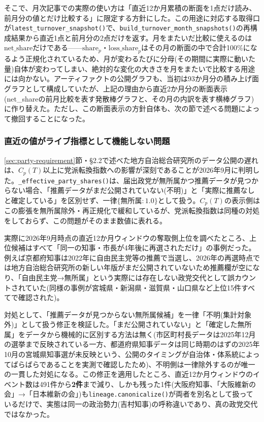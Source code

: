 \documentclass[a4paper,11pt]{ltjsarticle}
\begin{document}
そこで、月次記事での実際の使い方は「直近12か月累積の断面を1点だけ読み、前月分の値とだけ比較する」に限定する方針にした。この用途に対応する取得口が\texttt{latest\_turnover\_snapshot()}で、\texttt{build\_turnover\_month\_snapshots()}の再構成結果から直近1点と前月分の2点だけを返す。月をまたいだ比較に使えるのは$\text{net\_share}$だけである——$\text{share}_p$・$\text{loss\_share}_p$はその月の断面の中で合計100\%になるよう正規化されているため、月が変わるたびに分母(その期間に実際に動いた量)自体が変わってしまい、絶対的な変化の大きさを月をまたいで比較する用途には向かない。アーティファクトの公開グラフも、当初は93か月分の積み上げ面グラフとして構成していたが、上記の理由から直近2か月分の断面表示(net\_shareの前月比較を表す発散棒グラフと、その月の内訳を表す横棒グラフ)に作り替えた。ただし、この断面表示の方針自体も、次の節で述べる問題によって撤回することになった。

\subsubsection{直近の値がライブ指標として機能しない問題}
\label{sec:turnover-lag-problem}

\ref{sec:party-requirement}節・\S2.2で述べた地方自治総合研究所のデータ公開の遅れは、$C_p(T)$以上に党派転換指数への影響が深刻であることが2026年9月に判明した。\texttt{\_effective\_party\_shares()}は、届出政党が無所属かつ推薦データが見つからない場合、「推薦データがまだ公開されていない(不明)」と「実際に推薦なしと確定している」を区別せず、一律$\{$無所属$: 1.0\}$として扱う。$C_p(T)$の表示側はこの膨張を無所属除外・再正規化で緩和しているが、党派転換指数は同種の対処をしておらず、この問題がそのまま数値に表れる。

実際に2026年9月時点の直近12か月ウィンドウの奪取側上位を調べたところ、上位候補はすべて「同一の知事・市長が4年後に再選されただけ」の事例だった。例えば京都府知事は2022年に自由民主党等の推薦で当選し、2026年の再選時点では地方自治総合研究所の新しい年版がまだ公開されていないため推薦欄が空になり、「自由民主党→無所属」という実際には存在しない政党交代として誤カウントされていた(同様の事例が宮城県・新潟県・滋賀県・山口県など上位15件すべてで確認された)。

対処として、「推薦データが見つからない無所属候補」を一律「不明(集計対象外)」として扱う修正を検証した。「まだ公開されていない」と「確定した無所属」をデータから機械的に区別する方法は無く(市区町村長データは2025年12月の選挙まで反映されている一方、都道府県知事データは同じ時期のはずの2025年10月の宮城県知事選が未反映という、公開のタイミングが自治体・体系統によってばらばらであることを実測で確認したため)、不明側は一律除外するのが唯一の一貫した対処になる。この修正を適用したところ、直近12か月ウィンドウのイベント数は491件から\textbf{2件}まで減り、しかも残った1件(大阪府知事、「大阪維新の会」→「日本維新の会」)も\texttt{lineage.canonicalize()}が両者を別名として扱っているだけで、実態は同一の政治勢力(吉村知事)の呼称違いであり、真の政党交代ではなかった。
\end{document}
